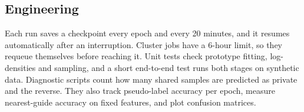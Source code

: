 \subsection{Engineering}\label{sec:engineering}
Each run saves a checkpoint every epoch and every 20 minutes, and it resumes automatically after an interruption.
Cluster jobs have a 6-hour limit, so they requeue themselves before reaching it.
Unit tests check prototype fitting, log-densities and sampling, and a short end-to-end test runs both stages on synthetic data.
Diagnostic scripts count how many shared samples are predicted as private and the reverse.
They also track pseudo-label accuracy per epoch, measure nearest-guide accuracy on fixed features, and plot confusion matrices.
